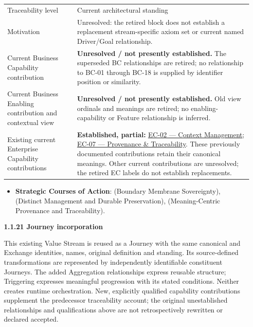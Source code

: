 \begin{longtable}{>{\raggedright\arraybackslash}p{}>{\raggedright\arraybackslash}p{}}
Traceability level & Current architectural standing \\
Motivation & Unresolved: the retired block does not establish a replacement stream-specific axiom set or current named Driver/Goal relationship. \\
Current Business Capability contribution & \textbf{Unresolved / not presently established.} The superseded BC relationships are retired; no relationship to BC-01 through BC-18 is supplied by identifier position or similarity. \\
Current Business Enabling contribution and contextual view & \textbf{Unresolved / not presently established.} Old view ordinals and meanings are retired; no enabling-capability or Feature relationship is inferred. \\
Existing current Enterprise Capability contributions & \textbf{Established, partial:} \href{\detokenize{../../../../../docs/markdown/02-strategy/capabilities/enterprise-capabilities.md#ec-02-context-management}}{EC-02 — Context Management}; \href{\detokenize{../../../../../docs/markdown/02-strategy/capabilities/enterprise-capabilities.md#ec-07-provenance--traceability}}{EC-07 — Provenance \& Traceability}. These previously documented contributions retain their canonical meanings. Other current contributions are unresolved; the retired EC labels do not establish replacements. \\
\end{longtable}


\begin{itemize}


\item \textbf{Strategic Courses of Action}: \texttt{} (Boundary Membrane Sovereignty), \texttt{} (Distinct Management and Durable Preservation), \texttt{} (Meaning-Centric Provenance and Traceability).

\end{itemize}


\par\medskip\textbf{1.1.21 Journey incorporation}\par


This existing Value Stream is reused as a Journey with the same canonical and Exchange identities, names, original definition and standing. Its source-defined transformations are represented by independently identifiable constituent Journeys. The added Aggregation relationships express reusable structure; Triggering expresses meaningful progression with its stated conditions. Neither creates runtime orchestration. New, explicitly qualified capability contributions supplement the predecessor traceability account; the original unestablished relationships and qualifications above are not retrospectively rewritten or declared accepted.


